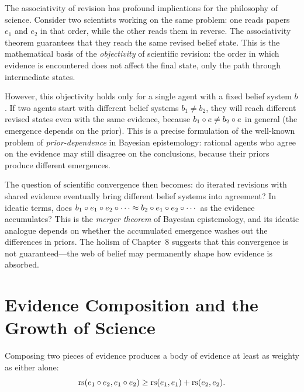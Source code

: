 \begin{remark}
The associativity of revision has profound implications for the philosophy of
science. Consider two scientists working on the same problem: one reads papers
$e_1$ and $e_2$ in that order, while the other reads them in reverse. The
associativity theorem guarantees that they reach the same revised belief state.
This is the mathematical basis of the \emph{objectivity} of scientific revision:
the order in which evidence is encountered does not affect the final state, only
the path through intermediate states.

However, this objectivity holds only for a single agent with a fixed belief
system $b$. If two agents start with different belief systems $b_1 \neq b_2$,
they will reach different revised states even with the same evidence, because
$b_1 \circ e \neq b_2 \circ e$ in general (the emergence depends on the
prior). This is a precise formulation of the well-known problem of
\emph{prior-dependence} in Bayesian epistemology: rational agents who agree on
the evidence may still disagree on the conclusions, because their priors produce
different emergences.

The question of scientific convergence then becomes: do iterated revisions with
shared evidence eventually bring different belief systems into agreement? In
ideatic terms, does $b_1 \circ e_1 \circ e_2 \circ \cdots \approx
b_2 \circ e_1 \circ e_2 \circ \cdots$ as the evidence accumulates?
This is the \emph{merger theorem} of Bayesian epistemology, and its ideatic
analogue depends on whether the accumulated emergence washes out the differences
in priors. The holism of Chapter~8 suggests that this convergence is not
guaranteed---the web of belief may permanently shape how evidence is absorbed.
\end{remark}

\section{Evidence Composition and the Growth of Science}

\begin{theorem}
\label{thm:evidence-composition}
Composing two pieces of evidence produces a body of evidence at least as weighty
as either alone:
\[
  \mathrm{rs}(e_1 \circ e_2, e_1 \circ e_2) \geq \mathrm{rs}(e_1, e_1) + \mathrm{rs}(e_2, e_2).
\]
\end{theorem}

